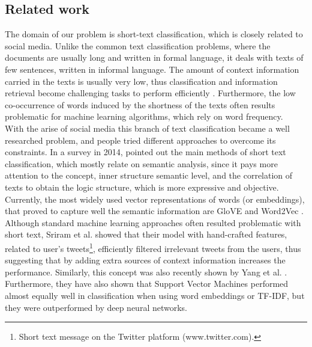 \documentclass[11pt,a4paper]{article}
\begin{document}
\subsection{Related work}
The domain of our problem is short-text classification, which is closely related to social media. Unlike the common text classification problems, where the documents are usually long and written in formal language, it deals with texts of few sentences, written in informal language. The amount of context information carried in the texts is usually very low, thus classification and information retrieval become challenging tasks to perform efficiently \cite{Song2014}. Furthermore, the low co-occurrence of words induced by the shortness of the texts often results problematic for machine learning algorithms, which rely on word frequency.\\
With the arise of social media this branch of text classification became a well researched problem, and people tried different approaches to overcome its constraints. In a survey in 2014, \cite{Song2014} pointed out the main methods of short text classification, which mostly relate on semantic analysis, since it pays more attention to the concept, inner structure semantic level, and the correlation of texts to obtain the logic structure, which is more expressive and objective. Currently, the most widely used vector representations of words (or embeddings), that proved to capture well the semantic information are GloVE \cite{glove2014} and Word2Vec \cite{word2vec}.\\
Although standard machine learning approaches often resulted problematic with short text, Sriram et al. \cite{Sriram2010} showed that their model with hand-crafted features, related to user's tweets\footnote{Short text message on the Twitter platform (www.twitter.com).}, efficiently filtered irrelevant tweets from the users, thus suggesting that by adding extra sources of context information increases the performance. Similarly, this concept was also recently shown by Yang et al. \cite{Yang2018}. Furthermore, they have also shown that Support Vector Machines performed almost equally well in classification when using word embeddings or TF-IDF, but they were outperformed by deep neural networks.\\
\end{document}
